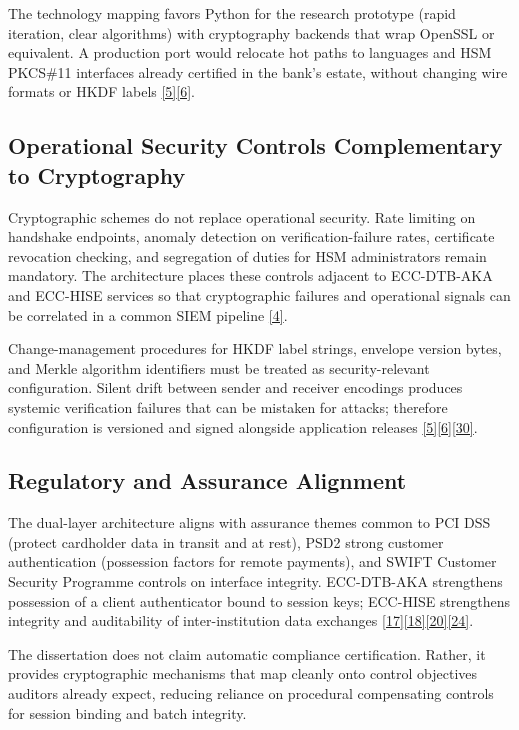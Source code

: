 \indent The technology mapping favors Python for the research prototype (rapid iteration, clear algorithms) with cryptography backends that wrap OpenSSL or equivalent. A production port would relocate hot paths to languages and HSM PKCS\#11 interfaces already certified in the bank's estate, without changing wire formats or HKDF labels \hyperref[ref:5]{[5]}\hyperref[ref:6]{[6]}.

\subsection{Operational Security Controls Complementary to Cryptography}

\indent Cryptographic schemes do not replace operational security. Rate limiting on handshake endpoints, anomaly detection on verification-failure rates, certificate revocation checking, and segregation of duties for HSM administrators remain mandatory. The architecture places these controls adjacent to ECC-DTB-AKA and ECC-HISE services so that cryptographic failures and operational signals can be correlated in a common SIEM pipeline \hyperref[ref:4]{[4]}.

\indent Change-management procedures for HKDF label strings, envelope version bytes, and Merkle algorithm identifiers must be treated as security-relevant configuration. Silent drift between sender and receiver encodings produces systemic verification failures that can be mistaken for attacks; therefore configuration is versioned and signed alongside application releases \hyperref[ref:5]{[5]}\hyperref[ref:6]{[6]}\hyperref[ref:30]{[30]}.

\subsection{Regulatory and Assurance Alignment}

\indent The dual-layer architecture aligns with assurance themes common to PCI DSS (protect cardholder data in transit and at rest), PSD2 strong customer authentication (possession factors for remote payments), and SWIFT Customer Security Programme controls on interface integrity. ECC-DTB-AKA strengthens possession of a client authenticator bound to session keys; ECC-HISE strengthens integrity and auditability of inter-institution data exchanges \hyperref[ref:17]{[17]}\hyperref[ref:18]{[18]}\hyperref[ref:20]{[20]}\hyperref[ref:24]{[24]}.

\indent The dissertation does not claim automatic compliance certification. Rather, it provides cryptographic mechanisms that map cleanly onto control objectives auditors already expect, reducing reliance on procedural compensating controls for session binding and batch integrity.

